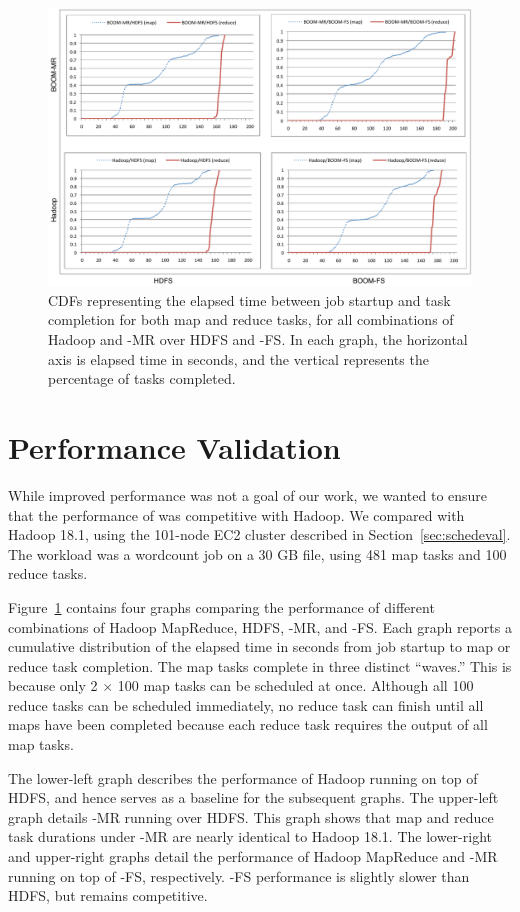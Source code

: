 \begin{figure}
	\includegraphics{figures/fourgraphs}
\caption{CDFs representing the elapsed time between job startup and task
  completion for both map and reduce tasks, for all combinations of Hadoop and \BOOM-MR
  over HDFS and \BOOM-FS\@.  In each graph, the horizontal axis is
  elapsed time in seconds, and the vertical represents the percentage of tasks completed.}
\label{fig:ec2experiment}
\end{figure}

\section{Performance Validation}
\label{sec:eval}
While improved performance was not a goal of our work, we wanted to
ensure that the performance of \BOOMA was competitive with Hadoop.
We compared \BOOMA with Hadoop 18.1, using the 101-node EC2 cluster
described in Section~\ref{sec:schedeval}. The workload was a wordcount job
on a 30 GB file, using 481 map tasks and 100 reduce tasks.

Figure~\ref{fig:ec2experiment} contains four graphs comparing the performance of
different combinations of Hadoop MapReduce, HDFS, \BOOM-MR, and \BOOM-FS\@. Each
graph reports a cumulative distribution of the elapsed time in seconds from job
startup to map or reduce task completion. The map tasks complete in three
distinct ``waves.'' This is because only 2 $\times$ 100 map tasks can be
scheduled at once. Although all 100 reduce tasks can be scheduled immediately,
no reduce task can finish until all maps have been completed because each reduce
task requires the output of all map tasks.

The lower-left graph describes the performance of Hadoop running on top of HDFS,
and hence serves as a baseline for the subsequent graphs. The upper-left graph
details \BOOM-MR running over HDFS\@. This graph shows that map and reduce task
durations under \BOOM-MR are nearly identical to Hadoop 18.1. The lower-right
and upper-right graphs detail the performance of Hadoop MapReduce and \BOOM-MR
running on top of \BOOM-FS, respectively. \BOOM-FS performance is slightly
slower than HDFS, but remains competitive.

